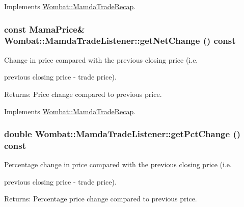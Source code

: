 Implements \hyperlink{classWombat_1_1MamdaTradeRecap_a876a7f85a983eec3a529d125721615b}{Wombat::Mamda\-Trade\-Recap}.\hypertarget{classWombat_1_1MamdaTradeListener_f9dc99814388d51987fa19c1b13ff07d}{
\subsubsection[getNetChange]{\setlength{\rightskip}{0pt plus 5cm}const Mama\-Price\& Wombat::Mamda\-Trade\-Listener::get\-Net\-Change () const}}
\label{classWombat_1_1MamdaTradeListener_f9dc99814388d51987fa19c1b13ff07d}


Change in price compared with the previous closing price (i.e. 

previous closing price - trade price).

\begin{Desc}
\item[Returns:]Price change compared to previous price. \end{Desc}


Implements \hyperlink{classWombat_1_1MamdaTradeRecap_6f0e8f7dd9edd3f29e29c1d983d6b7ff}{Wombat::Mamda\-Trade\-Recap}.\hypertarget{classWombat_1_1MamdaTradeListener_a1d7053dbff245beccdd8357c72d662c}{
\subsubsection[getPctChange]{\setlength{\rightskip}{0pt plus 5cm}double Wombat::Mamda\-Trade\-Listener::get\-Pct\-Change () const}}
\label{classWombat_1_1MamdaTradeListener_a1d7053dbff245beccdd8357c72d662c}


Percentage change in price compared with the previous closing price (i.e. 

previous closing price - trade price).

\begin{Desc}
\item[Returns:]Percentage price change compared to previous price. \end{Desc}


